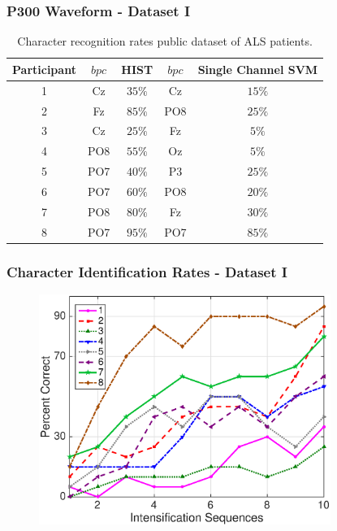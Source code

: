 \documentclass[aspectratio=169]{beamer}
\begin{document}
\begin{frame}
\frametitle{P300 Waveform - Dataset I}
\begin{center}
\begin{table}[h!]
\caption{Character recognition rates public dataset of ALS patients.}
\centering
\begin{tabular}{c|cc|cc}
\toprule
\textbf{Participant}	&  $bpc$ 	&  HIST &  $bpc$	&  Single Channel SVM \\
\midrule
1     &     Cz   &   $35\%$    &  Cz   & $15\%$   \\
2     &     Fz   &   $85\%$      &  PO8   & $25\%$   \\
3     &     Cz   &   $25\%$    &  Fz   & $5\%$   \\
4     &     PO8 &   $55\%$   &  Oz   & $5\%$    \\
5     &     PO7 &   $40\%$    &  P3   & $25\%$   \\
6     &     PO7 &   $60\%$  &  PO8   & $20\%$    \\
7     &     PO8 &   $80\%$   &  Fz   & $30\%$     \\
8     &     PO7 &   $95\%$     &  PO7   & $85\%$ \\

\end{tabular}
\label{tab:resultsals}
\end{table}
\end{center}
\end{frame} 


\begin{frame}
\frametitle{Character Identification Rates - Dataset I}
\begin{center}
\begin{figure}[h!]
\centering
\includegraphics[width=9.5cm]{images/performance.eps}
\label{fig:performance}
\end{figure}
\end{center}
\end{frame} 
\end{document}
